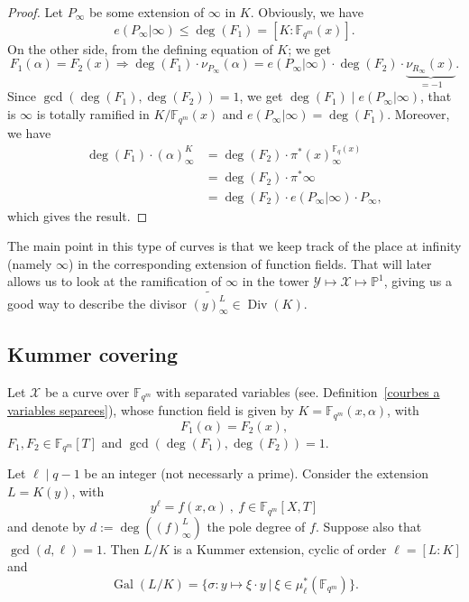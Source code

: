 \documentclass[10pt]{article}
\theoremstyle{definition}
\theoremstyle{definition}
\theoremstyle{definition}
\newcommand{\s}{\vspace{0.3cm}}
\newcommand{\cd}{\cdot}
\newcommand{\PP}{\mathbb{P}}
\newcommand{\fqm}{\mathbb{F}_{q^m}}
\newcommand{\fq}{\mathbb{F}_q}
\newcommand{\X}{\mathcal{X}}
\newcommand{\Y}{\mathcal{Y}}
\newcommand{\Div}{\operatorname{Div}}
\newcommand{\Gal}{\operatorname{Gal}}
\begin{document}
\s

\begin{proof}
Let $P_{\infty}$ be some extension of $\infty$ in $K$. Obviously, we have
\[e(P_{\infty}|\infty) \leq \deg(F_1)=[K:\fqm(x)].\]
On the other side, from the defining equation of $K$; we get
\[F_1(\alpha) = F_2(x) \Rightarrow \deg(F_1) \cd \nu_{P_{\infty}}(\alpha) = e(P_{\infty}|\infty) \cd \deg(F_2) \cd \underbrace{\nu_{R_{\infty}}(x)}_{=-1}.\]
Since $\gcd(\deg(F_1),\deg( F_2))=1$, we get $\deg(F_1) \mid e(P_{\infty}|\infty)$, that is $\infty$ is totally ramified in $K/\fqm(x)$ and $e(P_{\infty}|\infty)=\deg(F_1)$. Moreover, we have 
\begin{align*}
\deg(F_1) \cd (\alpha)^K_{\infty} &= \deg(F_2) \cd \pi^*(x)^{\fq(x)}_{\infty} \\
&= \deg(F_2) \cd \pi^*\infty \\
&= \deg(F_2) \cd e(P_{\infty}|\infty) \cd P_{\infty},
\end{align*}
which gives the result.
\end{proof}

\s

The main point in this type of curves is that we keep track of the place at infinity (namely $\infty$) in the corresponding extension of function fields. That will later allows us to look at the ramification of $\infty$ in the tower $\Y \longmapsto \X \longmapsto \PP^1$, giving us a good way to describe the divisor $\widetilde{(y)_{\infty}^L} \in \Div(K)$.


\s

\subsection{Kummer covering} \label{sectionkummer}

\s

Let $\X$ be a curve over $\fqm$ with separated variables (see. Definition~\ref{courbes a variables separees}), whose function field is given by $K=\fqm(x,\alpha)$, with
\[F_1(\alpha) = F_2(x),\] 
$F_1,F_2 \in \fqm[T]$ and $\gcd(\deg(F_1),\deg(F_2))=1$. 

\s

Let $\ell \mid q-1$ be an integer (not necessarly a prime). Consider the extension $L=K(y)$, with
\begin{equation} \label{kummer}
y^{\ell} = f(x,\alpha) \ , \ f \in \fqm[X,T] 
\end{equation}
and denote by \color{purple} $d:=\deg\left((f)^L_{\infty}\right)$ the pole degree of $f$. \color{black}
Suppose also that $\gcd(d,\ell)=1$. Then $L/K$ is a Kummer extension, cyclic of order $\ell=[L:K]$ and 
\[\Gal(L/K) = \{ \sigma : y \mapsto \xi \cd y \ | \ \xi \in \mu^*_{\ell}(\fqm)\}.\] 
\end{document}
